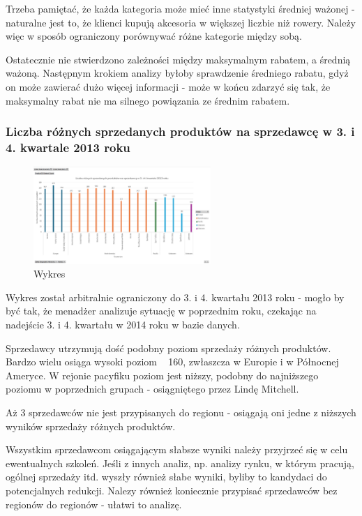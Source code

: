 \documentclass[a4paper,12pt]{article}
\begin{document}
Trzeba pamiętać, że każda kategoria może mieć inne statystyki średniej ważonej - naturalne jest to, że klienci kupują akcesoria w większej liczbie niż rowery. Należy więc w sposób ograniczony porównywać różne kategorie między sobą.

Ostatecznie nie stwierdzono zależności między maksymalnym rabatem, a średnią ważoną. Następnym krokiem analizy byłoby sprawdzenie średniego rabatu, gdyż on może zawierać dużo więcej informacji - może w końcu zdarzyć się tak, że maksymalny rabat nie ma silnego powiązania ze średnim rabatem.

\subsubsection{Liczba różnych sprzedanych produktów na sprzedawcę w 3. i 4. kwartale 2013 roku}

\begin{figure}[H]
  \centering
  \includegraphics[width=0.6\textwidth]{sales_salesperson.png}
  \caption{Wykres}
\end{figure}

Wykres został arbitralnie ograniczony do 3. i 4. kwartału 2013 roku - mogło by być tak, że menadżer analizuje sytuację w poprzednim roku, czekając na nadejście 3. i 4. kwartału w 2014 roku w bazie danych.

Sprzedawcy utrzymują dość podobny poziom sprzedaży różnych produktów. Bardzo wielu osiąga wysoki poziom ~ 160, zwłaszcza w Europie i w Północnej Ameryce. W rejonie pacyfiku poziom jest niższy, podobny do najniższego poziomu w poprzednich grupach - osiągniętego przez Lindę Mitchell.

Aż 3 sprzedawców nie jest przypisanych do regionu - osiągają oni jedne z niższych wyników sprzedaży różnych produktów.

Wszystkim sprzedawcom osiągającym słabsze wyniki należy przyjrzeć się w celu ewentualnych szkoleń. Jeśli z innych analiz, np. analizy rynku, w którym pracują, ogólnej sprzedaży itd. wyszły również słabe wyniki, byliby to kandydaci do potencjalnych redukcji. Nalezy również koniecznie przypisać sprzedawców bez regionów do regionów - ułatwi to analizę.
\end{document}
